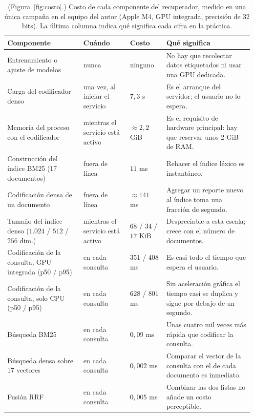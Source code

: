\documentclass[11pt,letterpaper]{article}
\numberwithin{equation}{section}
\begin{document}
\begin{table}[!htbp]
\centering
\footnotesize
\setlength{\tabcolsep}{4pt}
\renewcommand{\arraystretch}{1.3}
\caption{(Figura~\ref{fig:costo}.) Costo de cada componente del recuperador, medido en una única campaña en el equipo del autor (Apple M4, GPU integrada, precisión de 32 bits). La última columna indica qué significa cada cifra en la práctica.}
\label{tab:costo-componentes}
\begin{tabularx}{\textwidth}{@{}>{\raggedright\arraybackslash}p{3.9cm} >{\raggedright\arraybackslash}p{2.4cm} >{\raggedright\arraybackslash}p{1.7cm} Y@{}}
\toprule
\textbf{Componente} & \textbf{Cuándo} & \textbf{Costo} & \textbf{Qué significa} \\
\midrule
Entrenamiento o ajuste de modelos & nunca & ninguno & No hay que recolectar datos etiquetados ni usar una GPU dedicada. \\
Carga del codificador denso & una vez, al iniciar el servicio & $7{,}3$ s & Es el arranque del servidor; el usuario no lo espera. \\
Memoria del proceso con el codificador & mientras el servicio está activo & $\approx 2{,}2$ GiB & Es el requisito de hardware principal: hay que reservar unos 2 GiB de RAM. \\
Construcción del índice BM25 (17 documentos) & fuera de línea & $11$ ms & Rehacer el índice léxico es instantáneo. \\
Codificación densa de un documento & fuera de línea & $\approx 141$ ms & Agregar un reporte nuevo al índice toma una fracción de segundo. \\
Tamaño del índice denso ($1.024$ / $512$ / $256$ dim.) & mientras el servicio está activo & $68$ / $34$ / $17$ KiB & Despreciable a esta escala; crece con el número de documentos. \\
Codificación de la consulta, GPU integrada (p50 / p95) & en cada consulta & $351$ / $408$ ms & Es casi todo el tiempo que espera el usuario. \\
Codificación de la consulta, solo CPU (p50 / p95) & en cada consulta & $628$ / $801$ ms & Sin aceleración gráfica el tiempo casi se duplica y sigue por debajo de un segundo. \\
Búsqueda BM25 & en cada consulta & $0{,}09$ ms & Unas cuatro mil veces más rápida que codificar la consulta. \\
Búsqueda densa sobre 17 vectores & en cada consulta & $0{,}002$ ms & Comparar el vector de la consulta con el de cada documento es inmediato. \\
Fusión RRF & en cada consulta & $0{,}005$ ms & Combinar las dos listas no añade un costo perceptible. \\
\bottomrule
\end{tabularx}
\end{table}
\end{document}
